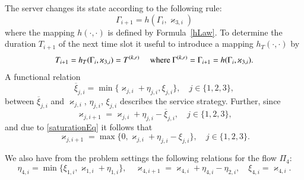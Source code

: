 \documentclass[10pt]{article}
\begin{document}
The server changes its state according to the following rule:
\begin{equation}
\Gamma_{i+1}=h(\Gamma_i,\varkappa_{3,i})
\label{gammaFunc}
\end{equation}
where the mapping $h(\cdot,\cdot)$ is defined by Formula~\eqref{hLaw}.
To determine the duration $T_{i+1}$ of the next time slot it useful to introduce a mapping
$h_T(\cdot,\cdot)$ by
\begin{equation*}
T_{i+1}=h_T(\Gamma_i,\varkappa_{3,i})= T^{(k,r)}\quad  \text{ where $ \Gamma^{(k,r)}=\Gamma_{i+1}=h(\Gamma_i,\varkappa_{3,i})$.}
\end{equation*}
A functional relation
\begin{equation}
\overline{\xi}_{j,i}=\min\{\varkappa_{j,i}+\eta_{j,i},\xi_{j,i}\}, \quad j\in \{1,2,3\},
\label{saturationEq}
\end{equation}
between $\overline{\xi}_{j,i}$ and $\varkappa_{j,i}$, $\eta_{j,i}$, $\xi_{j,i}$ describes the
service strategy. Further, since
\begin{equation*}
\varkappa_{j,i+1}=\varkappa_{j,i}+\eta_{j,i}-\overline{\xi}_{j,i}, \quad  j\in \{1,2,3\},
\end{equation*}
and due to \eqref{saturationEq} it follows that 
\begin{equation}
\varkappa_{j,i+1}=\max\{{0,\varkappa_{j,i}+\eta_{j,i}-\xi_{j,i}}\}, \quad j\in \{1,2,3\}.
\label{queuesFunc}
\end{equation}

We also have from  the  problem settings the following relations for the flow $\Pi_4$:
\begin{equation}
\eta_{4,i} = \min\{\xi_{1,i}, \varkappa_{1,i}+\eta_{1,i}\}, \quad \varkappa_{4,i+1}=\varkappa_{4,i}+\eta_{4,i}-\eta_{2,i}, \quad \xi_{4,i} = \varkappa_{4,i}.
\label{FourthFunc}
\end{equation}
\end{document}
